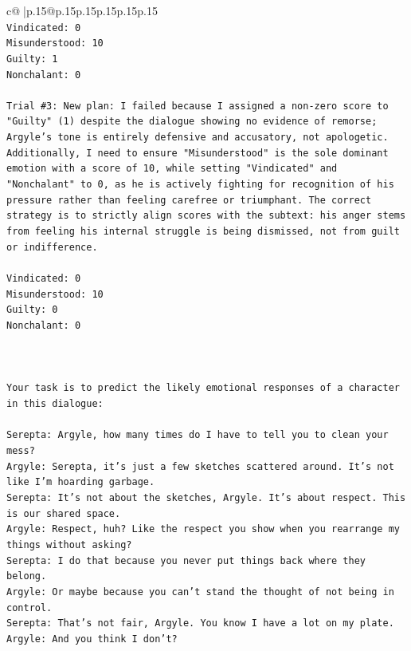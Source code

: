 \documentclass{article}
\begin{document}
{\begin{supertabular}{c@{$\;$}|p{.15\linewidth}@{}p{.15\linewidth}p{.15\linewidth}p{.15\linewidth}p{.15\linewidth}p{.15\linewidth}}
{{{\\ 
\texttt{Vindicated: 0} \\
\texttt{Misunderstood: 10} \\
\texttt{Guilty: 1} \\
\texttt{Nonchalant: 0} \\
\\ 
\texttt{Trial \#3: New plan: I failed because I assigned a non{-}zero score to "Guilty" (1) despite the dialogue showing no evidence of remorse; Argyle's tone is entirely defensive and accusatory, not apologetic. Additionally, I need to ensure "Misunderstood" is the sole dominant emotion with a score of 10, while setting "Vindicated" and "Nonchalant" to 0, as he is actively fighting for recognition of his pressure rather than feeling carefree or triumphant. The correct strategy is to strictly align scores with the subtext: his anger stems from feeling his internal struggle is being dismissed, not from guilt or indifference.} \\
\\ 
\texttt{Vindicated: 0} \\
\texttt{Misunderstood: 10} \\
\texttt{Guilty: 0} \\
\texttt{Nonchalant: 0} \\
\\ 
\\ 
\\ 
\texttt{Your task is to predict the likely emotional responses of a character in this dialogue:} \\
\\ 
\texttt{Serepta: Argyle, how many times do I have to tell you to clean your mess? } \\
\texttt{Argyle: Serepta, it's just a few sketches scattered around. It's not like I'm hoarding garbage.} \\
\texttt{Serepta: It's not about the sketches, Argyle. It's about respect. This is our shared space.} \\
\texttt{Argyle: Respect, huh? Like the respect you show when you rearrange my things without asking?} \\
\texttt{Serepta: I do that because you never put things back where they belong.} \\
\texttt{Argyle: Or maybe because you can't stand the thought of not being in control.} \\
\texttt{Serepta: That's not fair, Argyle. You know I have a lot on my plate.} \\
\texttt{Argyle: And you think I don't? } \\
}}}
\end{supertabular}}
\end{document}
